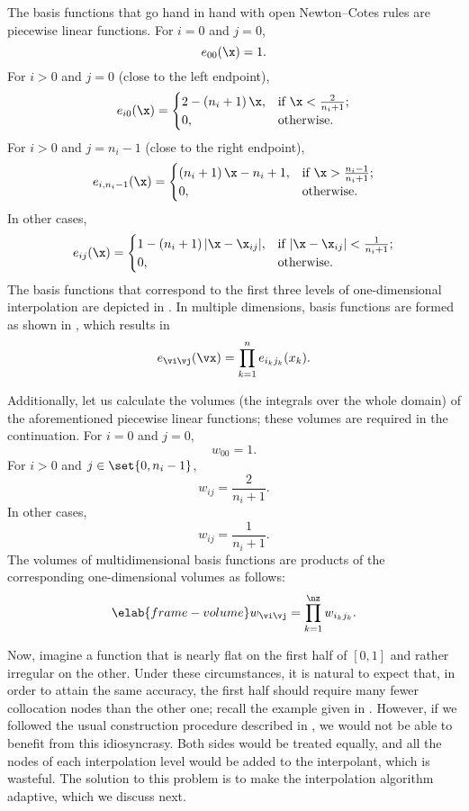 The basis functions that go hand in hand with open Newton--Cotes rules are
piecewise linear functions. For $i = 0$ and $j = 0$,
\[
  e_{00}(\x) = 1.
\]
For $i > 0$ and $j = 0$ (close to the left endpoint),
\[
  e_{i0}(\x) =
  \begin{cases}
    2 - \left(n_i + 1\right) \x, & \text{if } \x < \frac{2}{n_i + 1}; \\
    0, & \text{otherwise}.
  \end{cases}
\]
For $i > 0$ and $j = n_i - 1$ (close to the right endpoint),
\[
  e_{i, n_i - 1}(\x) =
  \begin{cases}
    \left(n_i + 1\right) \x - n_i + 1, & \text{if } \x > \frac{n_i - 1}{n_i + 1}; \\
    0, & \text{otherwise}.
  \end{cases}
\]
In other cases,
\[
  e_{ij}(\x) =
  \begin{cases}
    1 - \left(n_i + 1\right)|\x - \x_{ij}|, & \text{if } |\x - \x_{ij}| < \frac{1}{n_i + 1}; \\
    0, & \text{otherwise}.
  \end{cases}
\]
The basis functions that correspond to the first three levels of one-dimensional
interpolation are depicted in . In multiple dimensions, basis
functions are formed as shown in , which results in
\[
  e_{\vi \vj}(\vx) = \prod_{k = 1}^n e_{i_k j_k}(x_k).
\]

Additionally, let us calculate the volumes (the integrals over the whole domain)
of the aforementioned piecewise linear functions; these volumes are required in
the continuation. For $i = 0$ and $j = 0$,
\[
  w_{00} = 1.
\]
For $i > 0$ and $j \in \set{0, n_i - 1}$,
\[
  w_{ij} = \frac{2}{n_i + 1}.
\]
In other cases,
\[
  w_{ij} = \frac{1}{n_i + 1}.
\]
The volumes of multidimensional basis functions are products of the
corresponding one-dimensional volumes as follows:
\begin{equation} \elab{frame-volume}
  w_{\vi \vj} = \prod_{k = 1}^\nz w_{i_k j_k}.
\end{equation}

Now, imagine a function that is nearly flat on the first half of $[0, 1]$ and
rather irregular on the other. Under these circumstances, it is natural to
expect that, in order to attain the same accuracy, the first half should require
many fewer collocation nodes than the other one; recall the example given in
. However, if we followed the usual construction
procedure described in , we would not be able
to benefit from this idiosyncrasy. Both sides would be treated equally, and all
the nodes of each interpolation level would be added to the interpolant, which
is wasteful. The solution to this problem is to make the interpolation algorithm
adaptive, which we discuss next.

